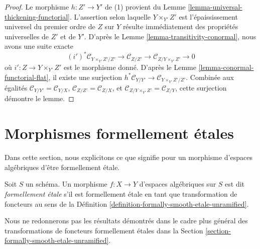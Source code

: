 \begin{proof}
Le morphisme $h : Z' \to Y'$ de (1) provient du
Lemme \ref{lemma-universal-thickening-functorial}.
L'assertion selon laquelle $Y \times_{Y'} Z'$ est l'épaississement universel du premier ordre
de $Z$ sur $Y$ résulte immédiatement des propriétés universelles
de $Z'$ et de $Y'$. D'après le
Lemme \ref{lemma-transitivity-conormal},
nous avons une suite exacte
$$
(i')^*\mathcal{C}_{Y \times_{Y'} Z'/Z'} \to
\mathcal{C}_{Z/Z'} \to
\mathcal{C}_{Z/Y \times_{Y'} Z'} \to 0
$$
où $i' : Z \to Y \times_{Y'} Z'$ est le morphisme donné. D'après le
Lemme \ref{lemma-conormal-functorial-flat},
il existe une surjection
$h^*\mathcal{C}_{Y/Y'} \to \mathcal{C}_{Y \times_{Y'} Z'/Z'}$.
Combinée aux égalités
$\mathcal{C}_{Y/Y'} = \mathcal{C}_{Y/X}$,
$\mathcal{C}_{Z/Z'} = \mathcal{C}_{Z/X}$, et
$\mathcal{C}_{Z/Y \times_{Y'} Z'} = \mathcal{C}_{Z/Y}$,
cette surjection démontre le lemme.
\end{proof}













\section{Morphismes formellement étales}
\label{section-formally-etale}

\noindent
Dans cette section, nous explicitons ce que signifie pour un morphisme d'espaces algébriques
d'être formellement étale.

\begin{definition}
\label{definition-formally-etale}
Soit $S$ un schéma. Un morphisme $f : X \to Y$ d'espaces algébriques sur $S$
est dit {\it formellement étale} s'il est formellement étale en tant que
transformation de foncteurs au sens de la
Définition \ref{definition-formally-smooth-etale-unramified}.
\end{definition}

\noindent
Nous ne redonnerons pas les résultats démontrés dans le cadre plus général des
transformations de foncteurs formellement étales dans la
Section \ref{section-formally-smooth-etale-unramified}.

